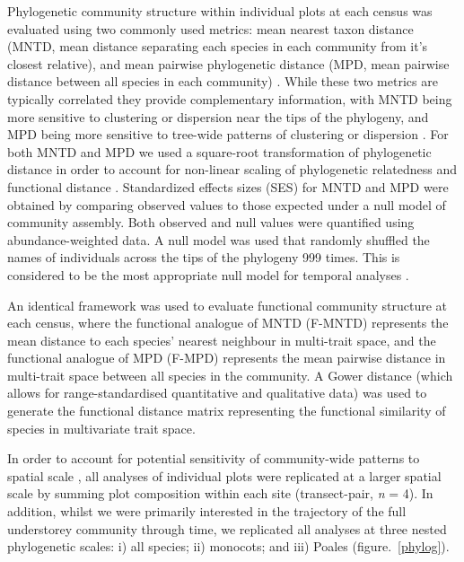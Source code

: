 Phylogenetic community structure within individual plots at each census was evaluated using two commonly used metrics: mean nearest taxon distance (MNTD, mean distance separating each species in each community from it's closest relative), and mean pairwise phylogenetic distance (MPD, mean pairwise distance between all species in each community) \citep{Webb2000, Webb2002}. While these two metrics are typically correlated they provide complementary information, with MNTD being more sensitive to clustering or dispersion near the tips of the phylogeny, and MPD being more sensitive to tree-wide patterns of clustering or dispersion \citep{Kembel2010}. For both MNTD and MPD we used a square-root transformation of phylogenetic distance in order to account for non-linear scaling of phylogenetic relatedness and functional distance \citep{Letten2014}. Standardized effects sizes (SES) for MNTD and MPD were obtained by comparing observed values to those expected under a null model of community assembly. Both observed and null values were quantified using abundance-weighted data. A null model was used that randomly shuffled the names of individuals across the tips of the phylogeny 999 times. This is considered to be the most appropriate null model for temporal analyses \citep{Swenson2012,Norden2012}.    

An identical framework was used to evaluate functional community structure at each census, where the functional analogue of MNTD (F-MNTD) represents the mean distance to each species' nearest neighbour in multi-trait space, and the functional analogue of MPD (F-MPD) represents the mean pairwise distance in multi-trait space between all species in the community. A Gower distance (which allows for range-standardised quantitative and qualitative data) was used to generate the functional distance matrix representing the functional similarity of species in multivariate trait space. 

In order to account for potential sensitivity of community-wide patterns to spatial scale \citep{Swenson2006}, all analyses of individual plots were replicated at a larger spatial scale by summing plot composition within each site (transect-pair, \textit{n} = 4). In addition, whilst we were primarily interested in the trajectory of the full understorey community through time, we replicated all analyses at three nested phylogenetic scales: i) all species; ii) monocots; and iii) Poales (figure.~\ref{phylog}). 

